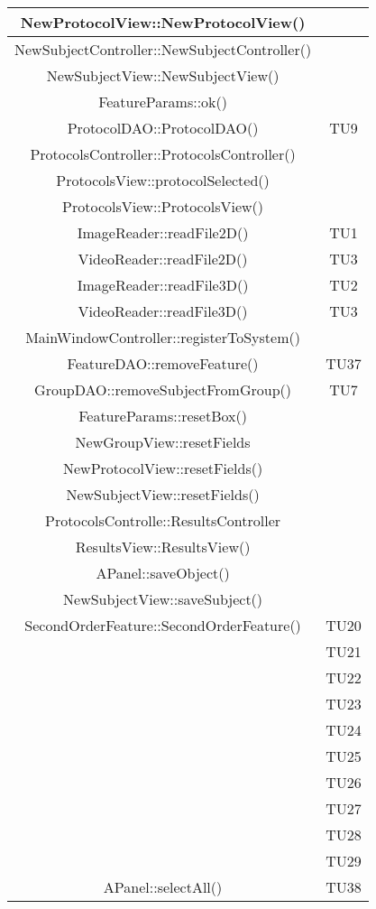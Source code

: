 \begin{center}
\begin{longtable}{|c|c|}
\hline 
NewProtocolView::NewProtocolView() &  \\
\hline 
NewSubjectController::NewSubjectController() &  \\
\hline 
NewSubjectView::NewSubjectView() &  \\
\hline 
FeatureParams::ok() &  \\
\hline 
ProtocolDAO::ProtocolDAO() & TU9 \\
\hline 
ProtocolsController::ProtocolsController() &  \\
\hline 
ProtocolsView::protocolSelected() &  \\
\hline 
ProtocolsView::ProtocolsView() &  \\
\hline 
ImageReader::readFile2D() & TU1 \\
\hline 
VideoReader::readFile2D() & TU3 \\
\hline 
ImageReader::readFile3D() & TU2 \\
\hline 
VideoReader::readFile3D() & TU3 \\
\hline 
MainWindowController::registerToSystem() &  \\
\hline 
FeatureDAO::removeFeature() & TU37 \\
\hline 
GroupDAO::removeSubjectFromGroup() & TU7 \\
\hline 
FeatureParams::resetBox() &  \\
\hline 
NewGroupView::resetFields &  \\
\hline 
NewProtocolView::resetFields() &  \\
\hline 
NewSubjectView::resetFields() &  \\
\hline 
ProtocolsControlle::ResultsController &  \\
\hline 
ResultsView::ResultsView() &  \\
\hline 
APanel::saveObject() &  \\
\hline 
NewSubjectView::saveSubject() &  \\
\hline 
SecondOrderFeature::SecondOrderFeature() & TU20 \\
 & TU21 \\
 & TU22 \\
 & TU23 \\
 & TU24 \\
 & TU25 \\
 & TU26 \\
 & TU27 \\
 & TU28 \\
 & TU29 \\
\hline 
APanel::selectAll() & TU38 \\

\end{longtable}
\end{center}
